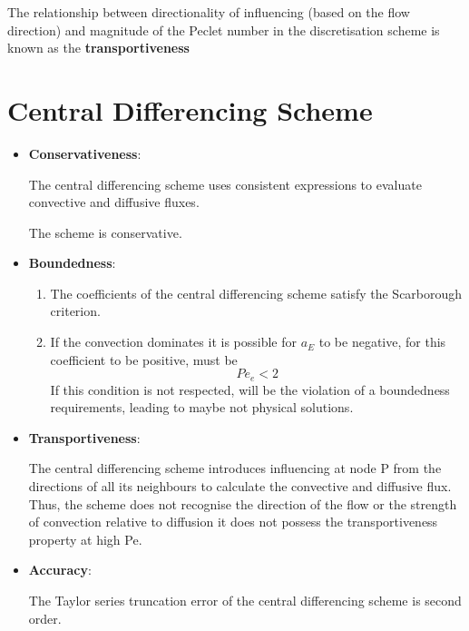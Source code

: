 \documentclass[a4paper, 15pt]{article}
\begin{document}
\begin{tcolorbox}[colback=red!5!white,colframe=red!75!black,title=Take Home Message]
	The
relationship between directionality of influencing (based on the flow direction) and
magnitude of the Peclet number in the discretisation scheme is known as the \textbf{transportiveness}

\end{tcolorbox}



\section{Central Differencing Scheme}

	\begin{itemize}
		\item \textbf{Conservativeness}:
		
			The central differencing scheme uses consistent expressions to evaluate
			convective and diffusive fluxes.
			
			The scheme is conservative. 
			
		\item \textbf{Boundedness}:
		\begin{enumerate}
			\item The coefficients of
			the central differencing scheme satisfy the Scarborough criterion. 
			
			\item If the convection dominates it is possible for $a_E$ to be negative, for this coefficient to be positive, must be 
			\[Pe_e<2\]
			If this condition is not respected, will be the violation of a boundedness requirements, leading to maybe not physical solutions.
		\end{enumerate}
		
		
		\item \textbf{Transportiveness}:
		
		The central differencing scheme introduces influencing at node P from the directions of
		all its neighbours to calculate the convective and diffusive flux. 
		Thus, the scheme does not recognise the direction of the flow or the strength of convection relative to
		diffusion it does not possess the transportiveness property at high Pe.
		
		\item \textbf{Accuracy}:
		
		The Taylor series truncation error of the central differencing scheme is second order. 
	\end{itemize}
\end{document}

